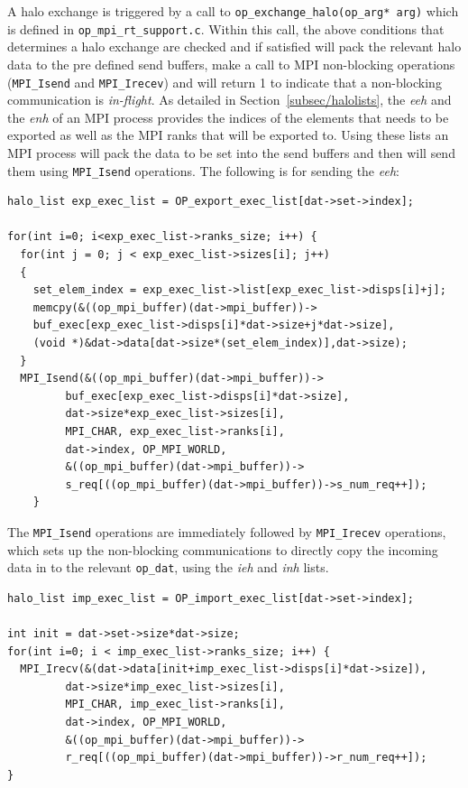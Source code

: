 \documentclass[11pt]{article}
\begin{document}
\noindent A halo exchange is triggered by a call to \texttt{op\_exchange\_halo(op\_arg* arg)} which is defined in
\texttt{op\_mpi\_rt\_support.c}. Within this call, the above conditions that determines a halo exchange are
checked and if satisfied will pack the relevant halo data to the pre defined send buffers, make a call to MPI
non-blocking operations (\texttt{MPI\_Isend} and \texttt{MPI\_Irecev}) and will return 1 to indicate that a non-blocking
communication is \textit{in-flight}. As detailed in Section~\ref{subsec/halolists}, the \textit{eeh} and the
\textit{enh} of an MPI process provides the indices of the elements that needs to be exported as well as the MPI ranks
that will be exported to. Using these lists an MPI process will pack the data to be set into the send buffers and then
will send them using \texttt{MPI\_Isend} operations. The following is for sending the \textit{eeh}:\newpage
\begin{verbatim}
halo_list exp_exec_list = OP_export_exec_list[dat->set->index];

for(int i=0; i<exp_exec_list->ranks_size; i++) {
  for(int j = 0; j < exp_exec_list->sizes[i]; j++)
  {
    set_elem_index = exp_exec_list->list[exp_exec_list->disps[i]+j];
    memcpy(&((op_mpi_buffer)(dat->mpi_buffer))->
    buf_exec[exp_exec_list->disps[i]*dat->size+j*dat->size],
    (void *)&dat->data[dat->size*(set_elem_index)],dat->size);
  }
  MPI_Isend(&((op_mpi_buffer)(dat->mpi_buffer))->
         buf_exec[exp_exec_list->disps[i]*dat->size],
         dat->size*exp_exec_list->sizes[i],
         MPI_CHAR, exp_exec_list->ranks[i],
         dat->index, OP_MPI_WORLD,
         &((op_mpi_buffer)(dat->mpi_buffer))->
         s_req[((op_mpi_buffer)(dat->mpi_buffer))->s_num_req++]);
    }
\end{verbatim}
\noindent The \texttt{MPI\_Isend} operations are immediately followed by
\texttt{MPI\_Irecev} operations, which sets up the non-blocking communications
to directly copy the incoming data in to the relevant \texttt{op\_dat}, using
the \textit{ieh} and \textit{inh} lists.
\begin{verbatim}
halo_list imp_exec_list = OP_import_exec_list[dat->set->index];

int init = dat->set->size*dat->size;
for(int i=0; i < imp_exec_list->ranks_size; i++) {
  MPI_Irecv(&(dat->data[init+imp_exec_list->disps[i]*dat->size]),
         dat->size*imp_exec_list->sizes[i],
         MPI_CHAR, imp_exec_list->ranks[i],
         dat->index, OP_MPI_WORLD,
         &((op_mpi_buffer)(dat->mpi_buffer))->
         r_req[((op_mpi_buffer)(dat->mpi_buffer))->r_num_req++]);
}
\end{verbatim}
\end{document}

